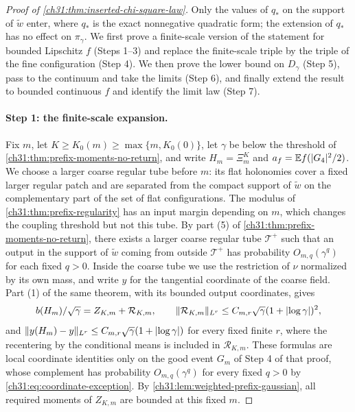 \begin{proof}[Proof of \cref{ch31:thm:inserted-chi-square-law}]
Only the values of $q_*$ on the support of $\widetilde w$ enter, where $q_*$ is the exact nonnegative quadratic form; the extension of $q_*$ has no effect on $\pi_\gamma$. We first prove a finite-scale version of the statement for bounded Lipschitz $f$ (Steps 1--3) and replace the finite-scale triple by the triple of the fine configuration (Step 4). We then prove the lower bound on $D_\gamma$ (Step 5), pass to the continuum and take the limits (Step 6), and finally extend the result to bounded continuous $f$ and identify the limit law (Step 7).

\paragraph{Step 1: the finite-scale expansion.}
Fix $m$, let $K\ge K_0(m)\ge\max\{m,K_0(0)\}$, let $\gamma$ be below the threshold of \cref{ch31:thm:prefix-moments-no-return}, and write $H_m=\Xi_m^K$ and $a_f=\mathbb E f(\lvert G_4\rvert^2/2)$. We choose a larger coarse regular tube before $m$: its flat holonomies cover a fixed larger regular patch and are separated from the compact support of $\widetilde w$ on the complementary part of the set of flat configurations. The modulus of \cref{ch31:thm:prefix-regularity} has an input margin depending on $m$, which changes the coupling threshold but not this tube. By part (5) of \cref{ch31:thm:prefix-moments-no-return}, there exists a larger coarse regular tube $\mathcal T^+$ such that an output in the support of $\widetilde w$ coming from outside $\mathcal T^+$ has probability $O_{m,q}(\gamma^q)$ for each fixed $q>0$. Inside the coarse tube we use the restriction of $\nu$ normalized by its own mass, and write $y$ for the tangential coordinate of the coarse field. Part (1) of the same theorem, with its bounded output coordinates, gives
\[
 b(H_m)/\sqrt\gamma=Z_{K,m}+\mathcal R_{K,m},\qquad\lVert \mathcal R_{K,m}\rVert_{L^r}\le C_{m,r}\sqrt\gamma(1+\lvert \log\gamma\rvert)^2,
\]
and $\lVert y(H_m)-y\rVert_{L^r}\le C_{m,r}\sqrt\gamma(1+\lvert \log\gamma\rvert)$ for every fixed finite $r$, where the recentering by the conditional means is included in $\mathcal R_{K,m}$. These formulas are local coordinate identities only on the good event $G_m$ of Step 4 of that proof, whose complement has probability $O_{m,q}(\gamma^q)$ for every fixed $q>0$ by \eqref{ch31:eq:coordinate-exception}. By \cref{ch31:lem:weighted-prefix-gaussian}, all required moments of $Z_{K,m}$ are bounded at this fixed $m$.


\end{proof}
